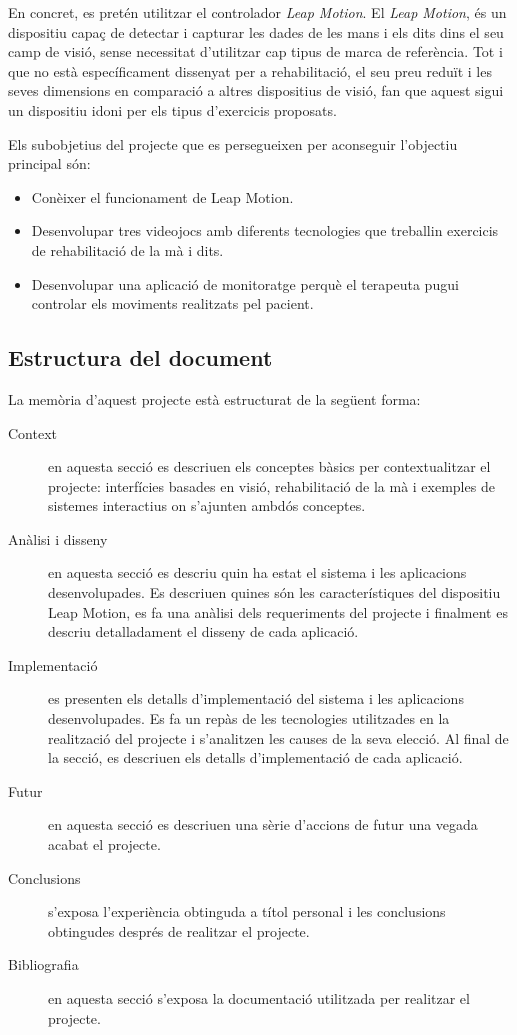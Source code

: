 \documentclass[12pt,a4paper,catalan]{article}
\begin{document}
	En concret, es pretén utilitzar el controlador \textit{Leap Motion}. El \textit{Leap Motion}, és un dispositiu capaç de detectar i capturar les dades de les mans i els dits dins el seu camp de visió, sense necessitat d'utilitzar cap tipus de marca de referència. Tot i que no està específicament dissenyat per a rehabilitació, el seu preu reduït i les seves dimensions en comparació a altres dispositius de visió, fan que aquest sigui un dispositiu idoni per els tipus d'exercicis proposats.
	
	Els subobjetius del projecte que es persegueixen per aconseguir l'objectiu principal són:
	\begin{itemize}
		\item Conèixer el funcionament de Leap Motion.
		\item Desenvolupar tres videojocs amb diferents tecnologies que treballin exercicis de rehabilitació de la mà i dits.
		\item Desenvolupar una aplicació de monitoratge perquè el terapeuta pugui controlar els moviments realitzats pel pacient.
	\end{itemize}
	\subsection{Estructura del document}
	La memòria d'aquest projecte està estructurat de la següent forma:
	\begin{description}
		\item[Context] en aquesta secció es descriuen els conceptes bàsics per contextualitzar el projecte: interfícies basades en visió, rehabilitació de la mà i exemples de sistemes interactius on s'ajunten ambdós conceptes.
		\item[Anàlisi i disseny] en aquesta secció es descriu quin ha estat el sistema i les aplicacions desenvolupades. Es descriuen quines són les característiques del dispositiu Leap Motion, es fa una anàlisi dels requeriments del projecte i finalment es descriu detalladament el disseny de cada aplicació.
		\item[Implementació] es presenten els detalls d'implementació del sistema i les aplicacions desenvolupades. Es fa un repàs de les tecnologies utilitzades en la realització del projecte i s'analitzen les causes de la seva elecció. Al final de la secció, es descriuen els detalls d'implementació de cada aplicació.
		\item[Futur] en aquesta secció es descriuen una sèrie d'accions de futur una vegada acabat el projecte.
		\item[Conclusions] s'exposa l'experiència obtinguda a títol personal i les conclusions obtingudes després de realitzar el projecte.
		\item[Bibliografia] en aquesta secció s'exposa la documentació utilitzada per realitzar el projecte.
	\end{description}
\end{document}
